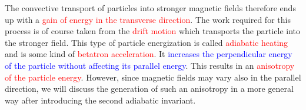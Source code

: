 \documentclass[12pt,a4paper]{article}
\begin{document}
The convective transport of particles into stronger magnetic fields therefore ends up with a \textcolor{red}{gain of energy in the transverse direction}. The work required for this process is of course taken from the \textcolor{red}{drift motion} which transports the particle into the stronger field. This type of particle energization is called \textcolor{red}{adiabatic heating} and is some kind of \textcolor{red}{betatron acceleration}. It \textcolor{blue}{increases the perpendicular energy of the particle without affecting its parallel energy}. This results in an \textcolor{red}{anisotropy of the particle energy}. However, since magnetic fields may vary also in the parallel direction, we will discuss the generation of such an anisotropy in a more general way after introducing the second adiabatic invariant. 
\end{document}
